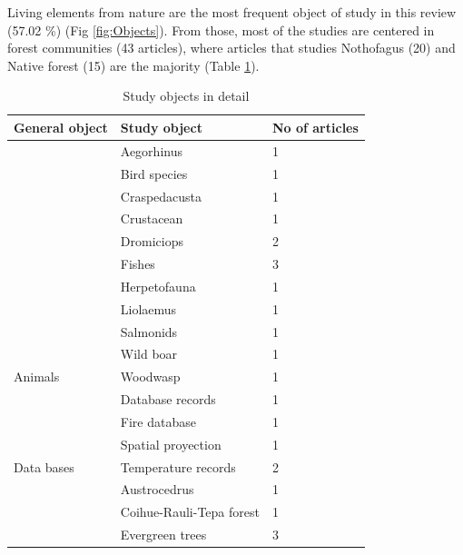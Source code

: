\documentclass[]{article}
\begin{document}
Living elements from nature are the most frequent object of study in this review (57.02 \%) (Fig \ref{fig:Objects}). From those, most of the studies are centered in forest communities (43 articles), where articles that studies Nothofagus (20) and Native forest (15) are the majority (Table \ref{tab:GeneralObject}).

\begin{table}

\caption{\label{tab:GeneralObject}Study objects in detail}
\centering
\begin{tabular}[t]{lll}
\toprule
General object & Study object & No of articles\\
\midrule
 & Aegorhinus & 1\\

 & Bird species & 1\\

 & Craspedacusta & 1\\

 & Crustacean & 1\\

 & Dromiciops & 2\\

 & Fishes & 3\\

 & Herpetofauna & 1\\

 & Liolaemus & 1\\

 & Salmonids & 1\\

 & Wild boar & 1\\

\multirow{-11}{*}{\raggedright\arraybackslash Animals} & Woodwasp & 1\\
\cmidrule{1-3}
 & Database records & 1\\

 & Fire database & 1\\

 & Spatial proyection & 1\\

\multirow{-4}{*}{\raggedright\arraybackslash Data bases} & Temperature records & 2\\
\cmidrule{1-3}
 & Austrocedrus & 1\\

 & Coihue-Rauli-Tepa forest & 1\\

 & Evergreen trees & 3\\


\end{tabular}
\end{table}
\end{document}
